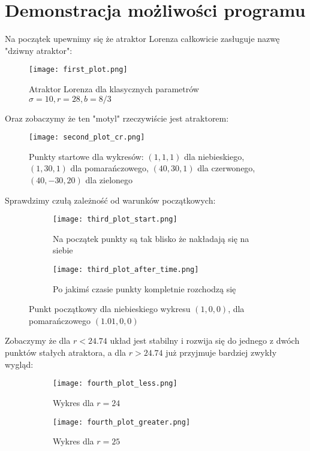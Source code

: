 \documentclass[12pt]{report}
\begin{document}
	\section{Demonstracja możliwości programu}
	\par Na początek upewnimy się że atraktor Lorenza całkowicie zasługuje nazwę "dziwny atraktor":
	\begin{figure}[H]
		\centering
		\texttt{[image: first\_plot.png]}
		\caption{Atraktor Lorenza dla klasycznych parametrów $\sigma = 10, r = 28, b = 8/3$}
		\label{fig:first_plot}
	\end{figure}
	Oraz zobaczymy że ten "motyl" rzeczywiście jest atraktorem:
	\begin{figure}[H]
		\centering
		\texttt{[image: second\_plot\_cr.png]}
		\caption{Punkty startowe dla wykresów: $(1, 1, 1)$ dla niebieskiego, $(1, 30, 1)$ dla pomarańczowego, $(40, 30, 1)$ dla czerwonego, $(40, -30, 20)$ dla zielonego}
		\label{fig:second_plot}
	\end{figure}
	Sprawdzimy czułą zależność od warunków początkowych:
	\begin{figure}[H]
		\centering
		\begin{subfigure}[b]{0.49\linewidth}
			\texttt{[image: third\_plot\_start.png]}
			\caption{Na początek punkty są tak blisko że nakładają się na siebie}
		\end{subfigure}
		\begin{subfigure}[b]{0.49\linewidth}
			\texttt{[image: third\_plot\_after\_time.png]}
			\caption{Po jakimś czasie punkty kompletnie rozchodzą się}
		\end{subfigure}
		\caption{Punkt początkowy dla niebieskiego wykresu $(1, 0, 0)$, dla pomarańczowego $(1.01, 0, 0)$}
		\label{fig:third_plot}
	\end{figure}
	Zobaczymy że dla $r < 24.74$ układ jest stabilny i rozwija się do jednego z dwóch punktów stałych atraktora, a dla $r > 24.74$ już przyjmuje bardziej zwykły wygląd:
	\begin{figure}[H]
		\centering
		\begin{subfigure}[b]{0.49\linewidth}
			\texttt{[image: fourth\_plot\_less.png]}
			\caption{Wykres dla $r = 24$}
		\end{subfigure}
		\begin{subfigure}[b]{0.49\linewidth}
			\texttt{[image: fourth\_plot\_greater.png]}
			\caption{Wykres dla $r = 25$}
		\end{subfigure}
		\caption{}
		\label{fig:fourth_plot}
	\end{figure}
\end{document}
